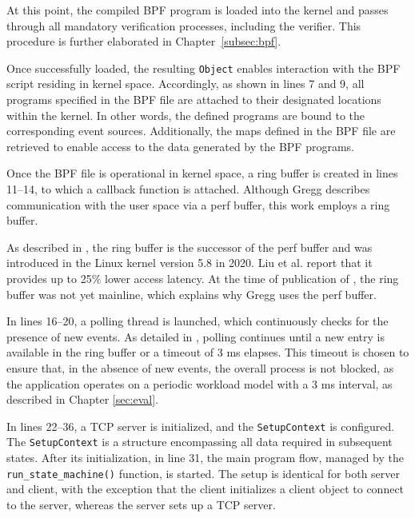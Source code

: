 At this point, the compiled \ac{BPF} program is loaded into the kernel and passes through all mandatory verification processes, including the verifier.  
This procedure is further elaborated in Chapter~\ref{subsec:bpf}.  

Once successfully loaded, the resulting \texttt{Object} enables interaction with the \ac{BPF} script residing in kernel space.  
Accordingly, as shown in lines 7 and 9, all programs specified in the \ac{BPF} file are attached to their designated locations within the kernel.  
In other words, the defined programs are bound to the corresponding event sources.  
Additionally, the maps defined in the \ac{BPF} file are retrieved to enable access to the data generated by the \ac{BPF} programs.  

Once the \ac{BPF} file is operational in kernel space, a ring buffer is created in lines 11--14, to which a callback function is attached.  
Although Gregg \cite[Chap. 2.1]{Gregg_2020} describes communication with the user space via a perf buffer, this work employs a ring buffer.  

As described in \cite{ring-buffer}, the ring buffer is the successor of the perf buffer and was introduced in the Linux kernel version 5.8 in 2020.  
Liu et al. \cite[p. 6]{10.1145/3672197.3673430} report that it provides up to 25\% lower access latency.  
At the time of publication of \cite{Gregg_2020}, the ring buffer was not yet mainline, which explains why Gregg uses the perf buffer.  

In lines 16--20, a polling thread is launched, which continuously checks for the presence of new events.  
As detailed in \cite{rb}, polling continues until a new entry is available in the ring buffer or a timeout of 3 ms elapses.  
This timeout is chosen to ensure that, in the absence of new events, the overall process is not blocked, as the application operates on a periodic workload model with a 3 ms interval, as described in Chapter \ref{sec:eval}.  

In lines 22--36, a \ac{TCP} server is initialized, and the \texttt{SetupContext} is configured.  
The \texttt{SetupContext} is a structure encompassing all data required in subsequent states.  
After its initialization, in line 31, the main program flow, managed by the \texttt{run\_state\_machine()} function, is started.  
The setup is identical for both server and client, with the exception that the client initializes a client object to connect to the server, whereas the server sets up a \ac{TCP} server.  

